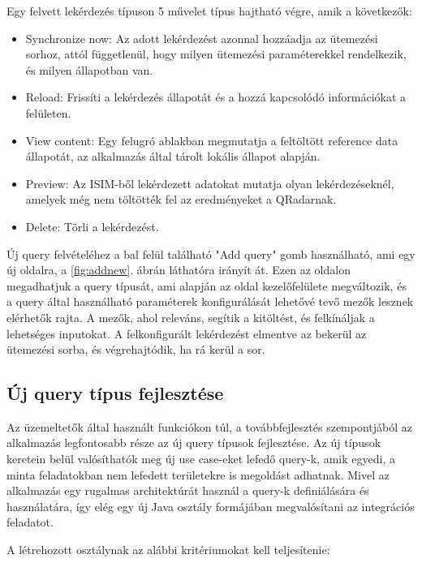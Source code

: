 Egy felvett lekérdezés típuson 5 művelet típus hajtható végre, amik a következők:
\begin{itemize}
	\item Synchronize now: Az adott lekérdezést azonnal hozzáadja az ütemezési sorhoz, attól függetlenül, hogy milyen ütemezési paraméterekkel rendelkezik, és milyen állapotban van.
	\item Reload: Frissíti a lekérdezés állapotát és a hozzá kapcsolódó információkat a felületen.
	\item View content: Egy felugró ablakban megmutatja a feltöltött reference data állapotát, az alkalmazás által tárolt lokális állapot alapján.
	\item Preview: Az ISIM-ből lekérdezett adatokat mutatja olyan lekérdezéseknél, amelyek még nem töltötték fel az eredményeket a QRadarnak.
	\item Delete: Törli a lekérdezést.
\end{itemize}

Új query felvételéhez a bal felül található "Add query" gomb használható, ami egy új oldalra, a \ref{fig:addnew}. ábrán láthatóra irányít át. Ezen az oldalon megadhatjuk a query típusát, ami alapján az oldal kezelőfelülete megváltozik, és a query által használható paraméterek konfigurálását lehetővé tevő mezők lesznek elérhetők rajta. A mezők, ahol releváns, segítik a kitöltést, és felkínáljak a lehetséges inputokat. A felkonfigurált lekérdezést elmentve az bekerül az ütemezési sorba, és végrehajtódik, ha rá kerül a sor.



\subsection{Új query típus fejlesztése}

Az üzemeltetők által használt funkciókon túl, a továbbfejlesztés szempontjából az alkalmazás legfontosabb része az új query típusok fejlesztése. Az új típusok keretein belül valósíthatók meg új use case-eket lefedő query-k, amik egyedi, a minta feladatokban nem lefedett területekre is megoldást adhatnak. Mivel az alkalmazás egy rugalmas architektúrát használ a query-k definiálására és használatára, így elég egy új Java osztály formájában megvalósítani az integrációs feladatot.

A létrehozott osztálynak az alábbi kritériumokat kell teljesítenie:

